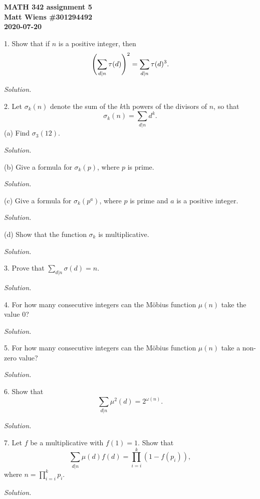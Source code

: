 \documentclass{article}
\begin{document}
\textbf{MATH 342 assignment 5} \\
\textbf{Matt Wiens \#301294492} \\
\textbf{2020-07-20}

1. Show that if $n$ is a positive integer, then
%
\begin{equation*}
    \del[4]{\sum_{d|n} \tau(d)}^2 = \sum_{d|n} \tau(d)^3
    .
\end{equation*}

\textit{Solution.}

\newpage

2. Let $\sigma_k(n)$ denote the sum of the $k$th powers of the divisors
of $n$, so that
%
\begin{equation*}
    \sigma_k(n) = \sum_{d|n} d^k
    .
\end{equation*}
%
(a) Find $\sigma_3(12)$.

\textit{Solution.}

\vspace{5mm}

(b) Give a formula for $\sigma_k(p)$, where $p$ is prime.

\textit{Solution.}

\vspace{5mm}

(c) Give a formula for $\sigma_k(p^a)$, where $p$ is prime
and $a$ is a positive integer.

\textit{Solution.}

\vspace{5mm}

(d) Show that the function $\sigma_k$ is multiplicative.

\textit{Solution.}

\newpage

3. Prove that $\sum_{d|n} \sigma(d) = n$.

\textit{Solution.}

\newpage

4. For how many consecutive integers can the Möbius function $\mu(n)$
take the value $0$?

\textit{Solution.}

\newpage

5. For how many consecutive integers can the Möbius function $\mu(n)$
take a non-zero value?

\textit{Solution.}

\newpage

6. Show that
%
\begin{equation*}
    \sum_{d|n} \mu^2(d) = 2^{\omega(n)}
    .
\end{equation*}

\textit{Solution.}

\newpage

7. Let $f$ be a multiplicative with $f(1) = 1$. Show that
%
\begin{equation*}
    \sum_{d|n} \mu(d) f(d) = \prod_{i = i}^k (1 - f(p_i))
    ,
\end{equation*}
%
where $n = \prod_{i = i}^k p_i$.

\textit{Solution.}
\end{document}
